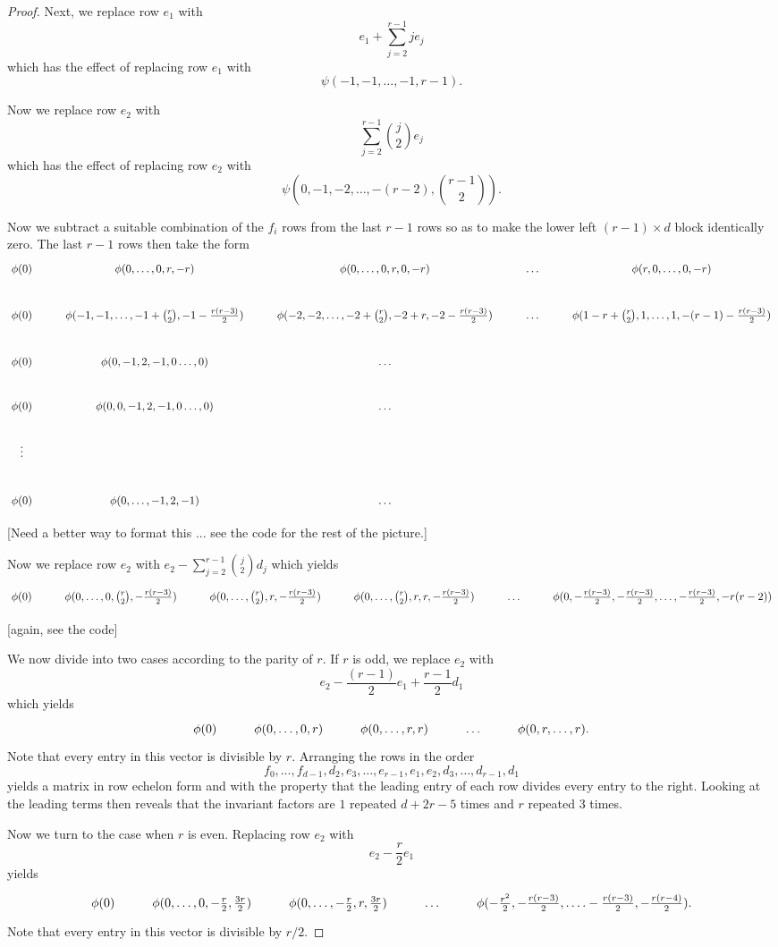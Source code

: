 \documentclass[reqno]{amsart}
\theoremstyle{definition}
\theoremstyle{remark}
\begin{document}
\begin{proof}
Next, we replace row $e_1$ with 
$$e_1+\sum_{j=2}^{r-1}je_j$$
which has the effect of replacing row $e_1$ with
$$\psi(-1,-1,\dots,-1,r-1).$$

Now we replace row $e_2$ with
$$\sum_{j=2}^{r-1}{j\choose 2}e_j$$
which has the effect of replacing row $e_2$ with
$$\psi\left(0,-1,-2,\dots,-(r-2),{r-1\choose2}\right).$$

Now we subtract a suitable combination of the $f_i$ rows from the
last $r-1$ rows so as to make the lower left $(r-1)\times d$ block
identically zero.  The last $r-1$ rows then take the form
$$\xymatrix{
\phi(0)&\phi(0,\dots,0,r,-r)&\phi(0,\dots,0,r,0,-r)&
\dots&\phi(r,0,\dots,0,-r)\\
\phi(0)&\phi(-1,-1,\dots,-1+{r\choose2},-1-\frac{r(r-3)}{2})&
\phi(-2,-2,\dots,-2+{r\choose2},-2+r,-2-\frac{r(r-3)}{2})&
\dots&\phi(1-r+{r\choose2},1,\dots,1,-(r-1)-\frac{r(r-3)}{2})\\
\phi(0)&\phi(0,-1,2,-1,0\dots,0)&\dots&&\\
\phi(0)&\phi(0,0,-1,2,-1,0\dots,0)&\dots&&\\
\vdots&&&&\\
\phi(0)&\phi(0,\dots,-1,2,-1)&\dots&&}$$

[Need a better way to format this ... see the code for the rest of the
picture.]

Now we replace row $e_2$ with  $e_2-\sum_{j=2}^{r-1}{j\choose 2}d_j$
which yields
$$\xymatrix{
\phi(0)&\phi(0,\dots,0,{r\choose2},-\frac{r(r-3)}{2})&
\phi(0,\dots,{r\choose2},r,-\frac{r(r-3)}{2})&
\phi(0,\dots,{r\choose2},r,r,-\frac{r(r-3)}{2})&
\dots&
\phi(0,-\frac{r(r-3)}{2},-\frac{r(r-3)}{2},\dots,-\frac{r(r-3)}{2},-r(r-2))}$$

[again, see the code]

We now divide into two cases according to the parity of $r$.  If $r$
is odd, we replace $e_2$ with 
$$e_2-\frac{(r-1)}2e_1+\frac{r-1}2d_1$$
which yields
$$\xymatrix{
\phi(0)&\phi(0,\dots,0,r)&\phi(0,\dots,r,r)&
\dots&\phi(0,r,\dots,r).}$$
Note that every entry in this vector is divisible by $r$.
Arranging the rows in the order
$$f_0,\dots,f_{d-1},d_2,e_3,\dots,e_{r-1},e_1,e_2,d_3,\dots,d_{r-1},d_1$$
yields a matrix in row echelon form and with the property that the
leading entry of each row divides every entry to the right.  Looking
at the leading terms then reveals that the invariant factors are $1$
repeated $d+2r-5$ times and $r$ repeated 3 times.  

Now we turn to the case when $r$ is even.  Replacing row $e_2$ with 
$$e_2-\frac r2e_1$$
yields
$$\xymatrix{
\phi(0)&\phi(0,\dots,0,-\frac r2,\frac{3r}2)&
\phi(0,\dots,-\frac r2,r,\frac{3r}2)&
\dots&\phi(-\frac{r^2}2,-\frac{r(r-3)}2,\dots.-\frac{r(r-3)}2,-\frac{r(r-4)}2).
}$$
Note that every entry in this vector is divisible by $r/2$.  


\end{proof}
\end{document}
